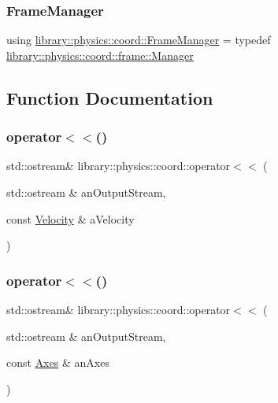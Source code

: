 \subsubsection{\texorpdfstring{Frame\+Manager}{FrameManager}}
{\footnotesize\ttfamily using \hyperlink{namespacelibrary_1_1physics_1_1coord_a9c01eac7b0a3e3c069800c98650323a8}{library\+::physics\+::coord\+::\+Frame\+Manager} = typedef \hyperlink{classlibrary_1_1physics_1_1coord_1_1frame_1_1_manager}{library\+::physics\+::coord\+::frame\+::\+Manager}}



\subsection{Function Documentation}
\mbox{\label{namespacelibrary_1_1physics_1_1coord_a5ed104e38499b8be17b32aecbad31c0c}} 
\subsubsection{\texorpdfstring{operator$<$$<$()}{operator<<()}\hspace{0.1cm}{\footnotesize\ttfamily [1/5]}}
{\footnotesize\ttfamily std\+::ostream\& library\+::physics\+::coord\+::operator$<$$<$ (\begin{DoxyParamCaption}\item[{std\+::ostream \&}]{an\+Output\+Stream,  }\item[{const \hyperlink{classlibrary_1_1physics_1_1coord_1_1_velocity}{Velocity} \&}]{a\+Velocity }\end{DoxyParamCaption})}

\mbox{\label{namespacelibrary_1_1physics_1_1coord_a0fb058763c93734fffc9ea94fa4f7622}} 
\subsubsection{\texorpdfstring{operator$<$$<$()}{operator<<()}\hspace{0.1cm}{\footnotesize\ttfamily [2/5]}}
{\footnotesize\ttfamily std\+::ostream\& library\+::physics\+::coord\+::operator$<$$<$ (\begin{DoxyParamCaption}\item[{std\+::ostream \&}]{an\+Output\+Stream,  }\item[{const \hyperlink{classlibrary_1_1physics_1_1coord_1_1_axes}{Axes} \&}]{an\+Axes }\end{DoxyParamCaption})}

